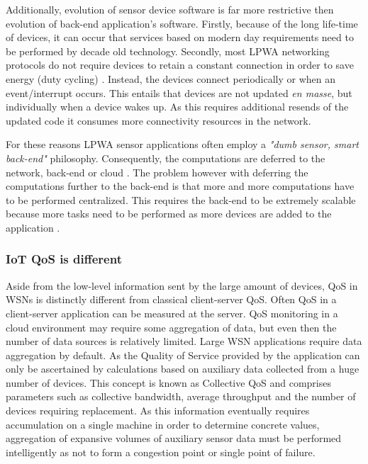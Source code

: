 Additionally, evolution of sensor device software is far more restrictive then evolution of back-end application's software. Firstly, because of the long life-time of devices, it can occur that services based on modern day requirements need to be performed by decade old technology. Secondly, most LPWA networking protocols do not require devices to retain a constant connection in order to save energy (duty cycling) \cite{tmobile, vodafone, on_duty_cycling, energy_challenges}. Instead, the devices connect periodically or when an event/interrupt occurs. This entails that devices are not updated \emph{en masse}, but individually when a device wakes up. As this requires additional resends of the updated code it consumes more connectivity resources in the network.

For these reasons LPWA sensor applications often employ a \emph{"dumb sensor, smart back-end"} philosophy. Consequently, the computations are deferred to the network, back-end or cloud \cite{popularity_applications_qos_moeilijk, defer_cloud}. The problem however with deferring the computations further to the back-end is that more and more computations have to be performed centralized. This requires the back-end to be extremely scalable because more tasks need to be performed as more devices are added to the application \cite{stream_requirements, iot_big_data_difficulties, qos_tradeoff}.

\subsubsection{IoT QoS is different}
Aside from the low-level information sent by the large amount of devices, QoS in WSNs is distinctly different from classical client-server QoS. Often QoS in a client-server application can be measured at the server. QoS monitoring in a cloud environment may require some aggregation of data, but even then the number of data sources is relatively limited. Large WSN applications require data aggregation by default. As the Quality of Service provided by the application can only be ascertained by calculations based on auxiliary data collected from a huge number of devices. This concept is known as Collective QoS \cite{qos_specific_wsn} and comprises parameters such as collective bandwidth, average throughput and the number of devices requiring replacement. As this information eventually requires accumulation on a single machine in order to determine concrete values, aggregation of expansive volumes of auxiliary sensor data must be performed intelligently as not to form a congestion point or single point of failure.

